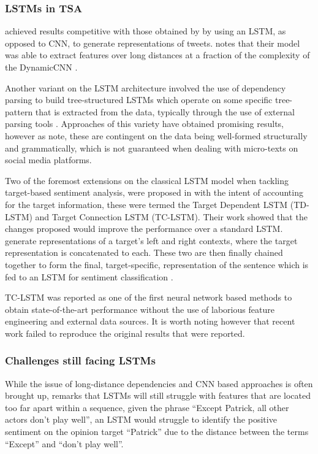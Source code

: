 \documentclass[../../fyp.tex]{subfiles}
\begin{document}
\subsubsection{LSTMs in TSA}
\citet{wang} achieved results competitive with those obtained by \citet{kalchbrenner2014} by using an LSTM, as opposed to CNN, to generate representations of tweets. \citet{young2017} notes that their model was able to extract features over long distances at a fraction of the complexity of the DynamicCNN \citep{kalchbrenner2014}.

Another variant on the LSTM architecture involved the use of dependency parsing to build tree-structured LSTMs which operate on some specific tree-pattern that is extracted from the data, typically through the use of external parsing tools \citep{socher2013}. Approaches of this variety \citep{jiweili2015,kaishengtai2015,zhu2015} have obtained promising results, however as \citet{chen2017} note, these are contingent on the data being well-formed structurally and grammatically, which is not guaranteed when dealing with micro-texts on social media platforms.

Two of the foremost extensions on the classical LSTM model when tackling target-based sentiment analysis, were proposed in \citet{tang2016b} with the intent of accounting for the target information, these were termed the Target Dependent LSTM (TD-LSTM) and Target Connection LSTM (TC-LSTM). Their work showed that the changes proposed would improve the performance over a standard LSTM. \citet{tang2016b} generate representations of a target's left and right contexts, where the target representation is concatenated to each. These two are then finally chained together to form the final, target-specific, representation of the sentence which is fed to an LSTM for sentiment classification \citep{dehongma2017}.

TC-LSTM \citep{tang2016b} was reported as one of the first neural network based methods to obtain state-of-the-art performance without the use of laborious feature engineering and external data sources. It is worth noting however that recent work \citep{moore2018} failed to reproduce the original results that were reported.

\subsubsection{Challenges still facing LSTMs}
While the issue of long-distance dependencies and CNN based approaches is often brought up, \citet{chen2017} remarks that LSTMs will still struggle with features that are located too far apart within a sequence, given the phrase \enquote{Except Patrick, all other actors don’t play well}, an LSTM would struggle to identify the positive sentiment on the opinion target \enquote{Patrick} due to the distance between the terms \enquote{Except} and \enquote{don't play well}.
\end{document}
